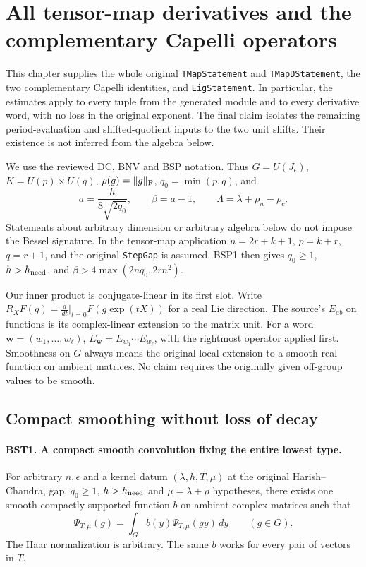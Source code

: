 \section{All tensor-map derivatives and the complementary Capelli operators}
\label{sec:bessel-shift-suppliers-v51}

This chapter supplies the whole original \texttt{TMapStatement} and
\texttt{TMapDStatement}, the two complementary Capelli identities, and
\texttt{EigStatement}.  In particular, the estimates apply to every
tuple from the generated module and to every derivative word, with no
loss in the original exponent.  The final claim isolates the remaining
period-evaluation and shifted-quotient inputs to the two unit shifts.
Their existence is not inferred from the algebra below.

We use the reviewed DC, BNV and BSP notation.  Thus
$G=U(J_\epsilon)$, $K=U(p)\times U(q)$, $\rho(g)=\|g\|_{\rm F}$,
$q_0=\min(p,q)$, and
\[
 a=\frac{h}{8\sqrt{2q_0}},\qquad \beta=a-1,\qquad
 \Lambda=\lambda+\rho_n-\rho_c.
 \tag{BST.1}
\]
Statements about arbitrary dimension or arbitrary algebra below do not
impose the Bessel signature.  In the tensor-map application
$n=2r+k+1$, $p=k+r$, $q=r+1$, and the original \texttt{StepGap}
is assumed.  BSP1 then gives $q_0\ge1$, $h>h_{\rm need}$, and
$\beta>4\max(2nq_0,2rn^2)$.

Our inner product is conjugate-linear in its first slot.  Write
$R_XF(g)=\frac{d}{dt}|_{t=0}F(g\exp(tX))$ for a real Lie direction.
The source's $E_{ab}$ on functions is its complex-linear extension to
the matrix unit.  For a word $\mathbf w=(w_1,\ldots,w_\ell)$,
$E_{\mathbf w}=E_{w_1}\cdots E_{w_\ell}$, with the rightmost
operator applied first.  Smoothness on $G$ always means the original
local extension to a smooth real function on ambient matrices.
No claim requires the originally given off-group values to be smooth.

\subsection{Compact smoothing without loss of decay}

\paragraph{BST1. A compact smooth convolution fixing the entire lowest type.}
\label{claim:BST1}
For arbitrary $n,\epsilon$ and a kernel datum
$(\lambda,h,T,\mu)$ at the original
Harish--Chandra, gap, $q_0\ge1$, $h>h_{\rm need}$ and
$\mu=\lambda+\rho$ hypotheses, there exists one smooth compactly
supported function $b$ on ambient complex matrices such that
\[
 \Psi_{T,\mu}(g)
    =\int_G b(y)\Psi_{T,\mu}(gy)\,dy\qquad(g\in G).
 \tag{BST.2}
\]
The Haar normalization is arbitrary.  The same $b$ works for every
pair of vectors in $T$.

